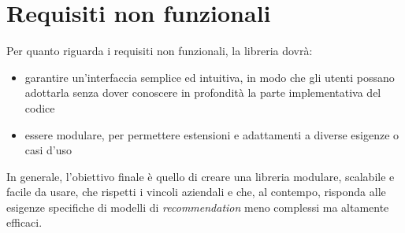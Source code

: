 \section{Requisiti non funzionali}

Per quanto riguarda i requisiti non funzionali, la libreria dovrà:

\begin{itemize}
    \item garantire un'interfaccia semplice ed intuitiva, in modo che gli utenti possano adottarla senza dover conoscere in profondità la parte implementativa del codice
    \item essere modulare, per permettere estensioni e adattamenti a diverse esigenze o casi d'uso
\end{itemize}

In generale, l'obiettivo finale è quello di creare una libreria modulare, scalabile e facile da usare, che rispetti i vincoli aziendali e che, al contempo, risponda alle esigenze specifiche di modelli di \textit{recommendation} meno complessi ma altamente efficaci.



